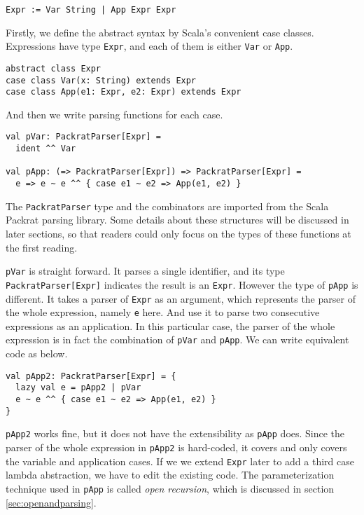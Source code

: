 \begin{lstlisting}[language=PlainCode]
Expr := Var String | App Expr Expr
\end{lstlisting}

Firstly, we define the abstract syntax by Scala's convenient case classes. Expressions have type \lstinline{Expr}, and each of them is either \lstinline{Var} or \lstinline{App}.

\begin{lstlisting}
abstract class Expr
case class Var(x: String) extends Expr
case class App(e1: Expr, e2: Expr) extends Expr
\end{lstlisting}

And then we write parsing functions for each case.

\begin{lstlisting}
val pVar: PackratParser[Expr] =
  ident ^^ Var

val pApp: (=> PackratParser[Expr]) => PackratParser[Expr] =
  e => e ~ e ^^ { case e1 ~ e2 => App(e1, e2) }
\end{lstlisting}

The \lstinline{PackratParser} type and the combinators are imported from the Scala Packrat parsing library. Some details about these structures will be discussed in later sections, so that readers could only focus on the types of these functions at the first reading.

\lstinline{pVar} is straight forward. It parses a single identifier, and its type \lstinline{PackratParser[Expr]} indicates the result is an \lstinline{Expr}. However the type of \lstinline{pApp} is different. It takes a parser of \lstinline{Expr} as an argument, which represents the parser of the whole expression, namely \lstinline{e} here. And use it to parse two consecutive expressions as an application. In this particular case, the parser of the whole expression is in fact the combination of \lstinline{pVar} and \lstinline{pApp}. We can write equivalent code as below.

\begin{lstlisting}
val pApp2: PackratParser[Expr] = {
  lazy val e = pApp2 | pVar
  e ~ e ^^ { case e1 ~ e2 => App(e1, e2) }
}
\end{lstlisting}

\lstinline{pApp2} works fine, but it does not have the extensibility as \lstinline{pApp} does. Since the parser of the whole expression in \lstinline{pApp2} is hard-coded, it covers and only covers the variable and application cases. If we we extend \lstinline{Expr} later to add a third case lambda abstraction, we have to edit the existing code. The parameterization technique used in \lstinline{pApp} is called \textit{open recursion}, which is discussed in section \ref{sec:openandparsing}.

